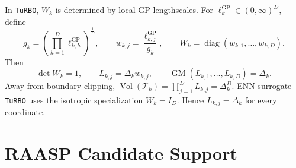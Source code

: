\documentclass[10pt]{article}
\numberwithin{equation}{section}
\newcommand{\TuRBO}{\textnormal{\texttt{TuRBO}}}
\newcommand{\TR}{\mathcal{T}}
\DeclareMathOperator{\diag}{diag}
\DeclareMathOperator{\Vol}{Vol}
\DeclareMathOperator{\GM}{GM}
\theoremstyle{plain}
\theoremstyle{definition}
\theoremstyle{remark}
\begin{document}
In \TuRBO{}, \(W_k\) is determined by local GP lengthscales.  For
\(\ell_k^{\mathrm{GP}}\in(0,\infty)^D\), define
\begin{equation}
  g_k
  =
  \left(\prod_{h=1}^{D}\ell_{k,h}^{\mathrm{GP}}\right)^{\frac{1}{D}},
  \qquad
  w_{k,j}
  =
  \frac{\ell_{k,j}^{\mathrm{GP}}}{g_k},
  \qquad
  W_k=\diag(w_{k,1},\ldots,w_{k,D}).
  \label{eq:shape-matrix}
\end{equation}
Then
\begin{equation}
  \det W_k=1,
  \qquad
  L_{k,j}=\Delta_k w_{k,j},
  \qquad
  \GM(L_{k,1},\ldots,L_{k,D})=\Delta_k .
  \label{eq:side-lengths}
\end{equation}
Away from boundary clipping, \(\Vol(\TR_k)=\prod_{j=1}^{D}L_{k,j}=\Delta_k^D\).
ENN-surrogate \TuRBO{} uses the isotropic specialization \(W_k=I_D\).  Hence
\(L_{k,j}=\Delta_k\) for every coordinate.

\section{RAASP Candidate Support}
\end{document}
